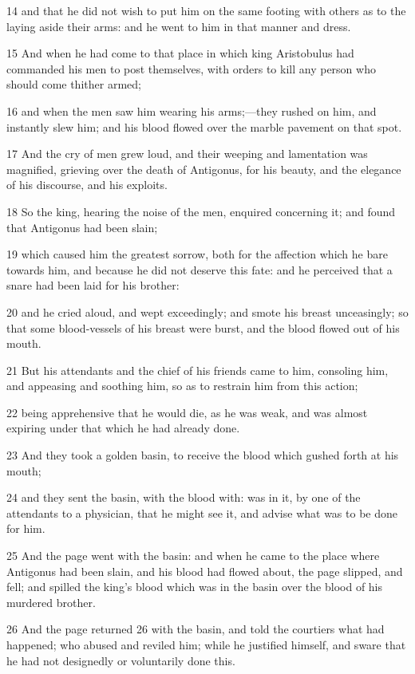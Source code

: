 14 and that he did not wish to put him on the same footing with others as to the laying aside their arms: and he went to him in that manner and dress. 

15 And when he had come to that place in which king Aristobulus had commanded his men to post themselves, with orders to kill any person who should come thither armed; 

16 and when the men saw him wearing his arms;—they rushed on him, and instantly slew him; and his blood flowed over the marble pavement on that spot. 

17 And the cry of men grew loud, and their weeping and lamentation was magnified, grieving over the death of Antigonus, for his beauty, and the elegance of his discourse, and his exploits. 

18 So the king, hearing the noise of the men, enquired concerning it; and found that Antigonus had been slain; 

19 which caused him the greatest sorrow, both for the affection which he bare towards him, and because he did not deserve this fate: and he perceived that a snare had been laid for his brother: 

20 and he cried aloud, and wept exceedingly; and smote his breast unceasingly; so that some blood-vessels of his breast were burst, and the blood flowed out of his mouth. 

21 But his attendants and the chief of his friends came to him, consoling him, and appeasing and soothing him, so as to restrain him from this action; 

22 being apprehensive that he would die, as he was weak, and was almost expiring under that which he had already done. 

23 And they took a golden basin, to receive the blood which gushed forth at his mouth; 

24 and they sent the basin, with the blood with: was in it, by one of the attendants to a physician, that he might see it, and advise what was to be done for him. 

25 And the page went with the basin: and when he came to the place where Antigonus had been slain, and his blood had flowed about, the page slipped, and fell; and spilled the king’s blood which was in the basin over the blood of his murdered brother. 

26 And the page returned 26 with the basin, and told the courtiers what had happened; who abused and reviled him; while he justified himself, and sware that he had not designedly or voluntarily done this. 

